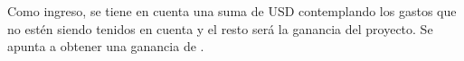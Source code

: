 


Como ingreso, se tiene en cuenta una suma de \TBD USD contemplando los gastos que no estén siendo tenidos en cuenta y el resto será la ganancia del proyecto. Se apunta a obtener una ganancia de \TBD.

%

